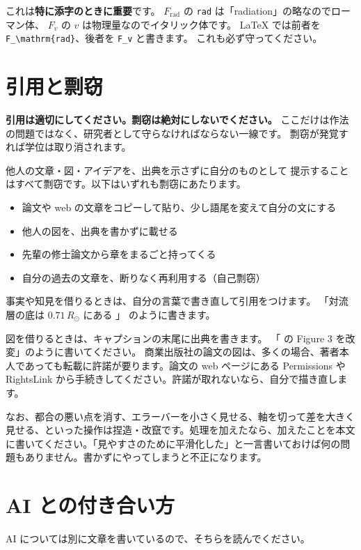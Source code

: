 これは\textbf{特に添字のときに重要}です。
$F_\mathrm{rad}$ の \texttt{rad} は「radiation」の略なのでローマン体、
$F_v$ の $v$ は物理量なのでイタリック体です。
\LaTeX{} では前者を \verb|F_\mathrm{rad}|、後者を \verb|F_v| と書きます。
これも必ず守ってください。

\section{引用と剽窃}
\label{sec:guide_citation}

\textbf{引用は適切にしてください。剽窃は絶対にしないでください。}
ここだけは作法の問題ではなく、研究者として守らなければならない一線です。
剽窃が発覚すれば学位は取り消されます。

他人の文章・図・アイデアを、出典を示さずに自分のものとして
提示することはすべて剽窃です。以下はいずれも剽窃にあたります。

\begin{itemize}
  \item 論文や web の文章をコピーして貼り、少し語尾を変えて自分の文にする
  \item 他人の図を、出典を書かずに載せる
  \item 先輩の修士論文から章をまるごと持ってくる
  \item 自分の過去の文章を、断りなく再利用する（自己剽窃）
\end{itemize}

事実や知見を借りるときは、自分の言葉で書き直して引用をつけます。
「対流層の底は $0.71\,R_\odot$ にある \citep{christensen-dalsgaard1991}」
のように書きます。

図を借りるときは、キャプションの末尾に出典を書きます。
「\citet{hotta2022} の Figure 3 を改変」のように書いてください。
商業出版社の論文の図は、多くの場合、著者本人であっても転載に許諾が要ります。論文の web ページにある \textsf{Permissions} や \textsf{RightsLink} から手続きしてください。許諾が取れないなら、自分で描き直します。

なお、都合の悪い点を消す、エラーバーを小さく見せる、軸を切って差を大きく見せる、といった操作は捏造・改竄です。処理を加えたなら、加えたことを本文に書いてください。「見やすさのために平滑化した」と一言書いておけば何の問題もありません。書かずにやってしまうと不正になります。

\section{AI との付き合い方}
\label{sec:guide_ai}

AI については別に文章を書いているので、そちらを読んでください。

